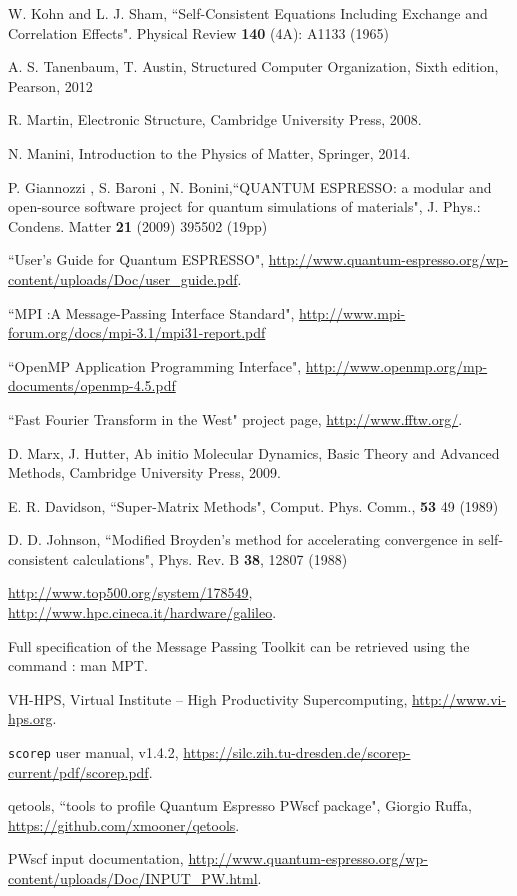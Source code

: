 \documentclass[a4paper,12pt]{article}
\begin{document}
\begin{thebibliography}{9}
W. Kohn and L. J. Sham, ``Self-Consistent Equations Including Exchange and Correlation Effects". Physical Review \textbf{140} (4A): A1133 (1965)


A. S. Tanenbaum, T. Austin,
Structured Computer Organization,
Sixth edition,
Pearson,
2012


R. Martin, 
Electronic Structure,
Cambridge University Press,
2008.

N. Manini, 
Introduction to the Physics of Matter,
Springer,
2014.


P. Giannozzi , S. Baroni , N. Bonini,``QUANTUM ESPRESSO: a modular and open-source software project for quantum simulations of materials", J. Phys.: Condens. Matter \textbf{21} (2009) 395502 (19pp)

``User's Guide for Quantum ESPRESSO", \url{http://www.quantum-espresso.org/wp-content/uploads/Doc/user_guide.pdf}.

``MPI :A Message-Passing Interface Standard", \url{http://www.mpi-forum.org/docs/mpi-3.1/mpi31-report.pdf}

``OpenMP Application Programming Interface", \url{http://www.openmp.org/mp-documents/openmp-4.5.pdf}

``Fast Fourier Transform in the West" project page, \url{http://www.fftw.org/}.


D. Marx, J. Hutter,
Ab initio Molecular Dynamics,
Basic Theory and Advanced Methods,
Cambridge University Press,
2009.

E. R. Davidson, ``Super-Matrix Methods", Comput. Phys. Comm., \textbf{53} 49 (1989)

D. D. Johnson, ``Modified Broyden’s method for accelerating convergence in self-consistent calculations", Phys. Rev. B \textbf{38}, 12807 (1988)

\url{http://www.top500.org/system/178549},
\url{http://www.hpc.cineca.it/hardware/galileo}.

Full specification of the Message Passing Toolkit can be retrieved using the command : man MPT.

VH-HPS, 
Virtual Institute – High Productivity Supercomputing, 
\url{http://www.vi-hps.org}.

\texttt{scorep} user manual, 
v1.4.2,
\url{https://silc.zih.tu-dresden.de/scorep-current/pdf/scorep.pdf}.

qetools, ``tools to profile Quantum Espresso PWscf package", Giorgio Ruffa, \url{https://github.com/xmooner/qetools}.

PWscf input documentation, \url{http://www.quantum-espresso.org/wp-content/uploads/Doc/INPUT_PW.html}.


\end{thebibliography}
\end{document}
